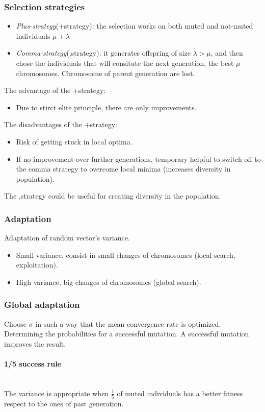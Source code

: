 \documentclass{article}
\begin{document}
\subsubsection{Selection strategies}
\begin{itemize}
    \item \textit{Plus-strategy}(+strategy): the selection works on both muted and not-muted individuals $\mu +\lambda$
    \item \textit{Comma-strategy}(,strategy): it generates offspring of size $\lambda>\mu$, and then chose the individuals
    that will consitute the next generation, the best $\mu$ chromosomes. Chromosome of parent generation
    are lost.
\end{itemize}
The advantage of the +strategy:
\begin{itemize}
    \item Due to stirct elite principle, there are only improvements.
\end{itemize}
The disadvantages of the +strategy:
\begin{itemize}
    \item Risk of getting stuck in local optima.
    \item If no improvement over further generations, temporary helpful to switch off to the
    comma strategy to overcome local minima (increases diversity in population).
\end{itemize}

The ,strategy could be useful for creating diversity in the population.

\subsubsection{Adaptation}
Adaptation of random vector's variance.
\begin{itemize}
    \item Small variance, consist in small changes of chromosomes (local search, exploitation).
    \item High variance, big changes of chromosomes (global search).
\end{itemize}

\subsubsection{Global adaptation}
Choose $\sigma$ in such a way that the mean convergence rate is optimized. Determining the probabilities
for a successful mutation. A successful mutation improves the result.
\paragraph{1/5 success rule}\mbox{}\\
The variance is appropriate when $\frac{1}{5}$ of muted individuals has a better fitness respect to
the ones of past generation.
\end{document}
